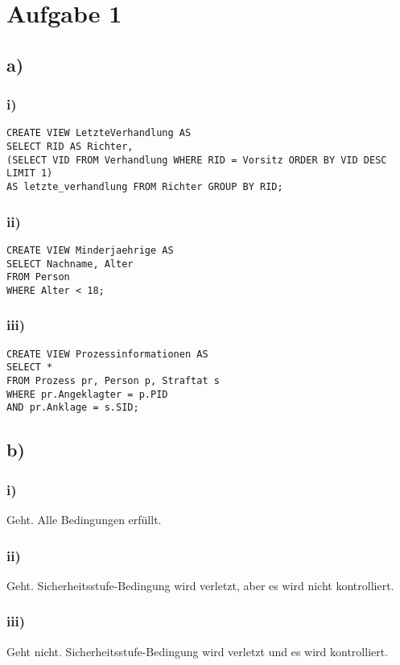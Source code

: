 \documentclass[a4paper,12pt,]{scrartcl}
\begin{document}
\section*{Aufgabe 1}
\subsection*{a)}

\subsubsection*{i)}
\begin{verbatim}
CREATE VIEW LetzteVerhandlung AS 
SELECT RID AS Richter,
(SELECT VID FROM Verhandlung WHERE RID = Vorsitz ORDER BY VID DESC LIMIT 1)
AS letzte_verhandlung FROM Richter GROUP BY RID;
\end{verbatim}

\subsubsection*{ii)}
\begin{verbatim}
CREATE VIEW Minderjaehrige AS 
SELECT Nachname, Alter
FROM Person
WHERE Alter < 18;
\end{verbatim}

\subsubsection*{iii)}
\begin{verbatim}
CREATE VIEW Prozessinformationen AS 
SELECT *
FROM Prozess pr, Person p, Straftat s
WHERE pr.Angeklagter = p.PID
AND pr.Anklage = s.SID;
\end{verbatim}

\subsection*{b)}
\subsubsection*{i)}
Geht. Alle Bedingungen erfüllt.

\subsubsection*{ii)}
Geht. Sicherheitsstufe-Bedingung wird verletzt, aber es wird nicht kontrolliert.

\subsubsection*{iii)}
Geht nicht. Sicherheitsstufe-Bedingung wird verletzt und es wird kontrolliert.
\end{document}
